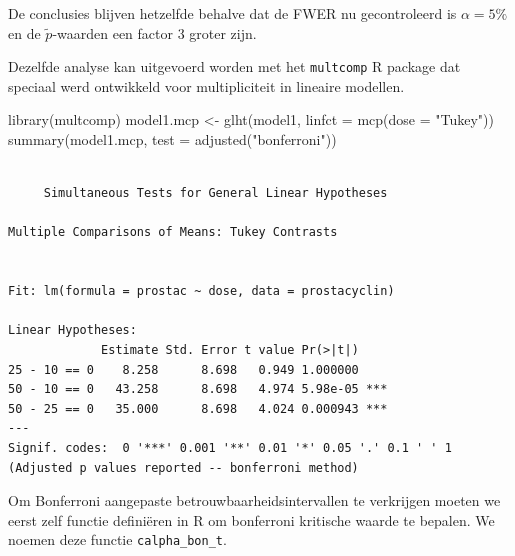 \documentclass[
  dutch,
  letterpaper,
  12pt]{book}
\newenvironment{Shaded}{\begin{snugshade}}{\end{snugshade}}
\newcommand{\AttributeTok}[1]{\textcolor[rgb]{0.40,0.45,0.13}{#1}}
\newcommand{\ControlFlowTok}[1]{\textcolor[rgb]{0.00,0.23,0.31}{\textbf{#1}}}
\newcommand{\DecValTok}[1]{\textcolor[rgb]{0.68,0.00,0.00}{#1}}
\newcommand{\FunctionTok}[1]{\textcolor[rgb]{0.28,0.35,0.67}{#1}}
\newcommand{\NormalTok}[1]{\textcolor[rgb]{0.00,0.23,0.31}{#1}}
\newcommand{\OtherTok}[1]{\textcolor[rgb]{0.00,0.23,0.31}{#1}}
\newcommand{\SpecialCharTok}[1]{\textcolor[rgb]{0.37,0.37,0.37}{#1}}
\newcommand{\StringTok}[1]{\textcolor[rgb]{0.13,0.47,0.30}{#1}}
\theoremstyle{definition}
\theoremstyle{definition}
\theoremstyle{definition}
\theoremstyle{remark}
\begin{document}
De conclusies blijven hetzelfde behalve dat de FWER nu gecontroleerd is
\(\alpha=5\%\) en de \(\tilde{p}\)-waarden een factor 3 groter zijn.

Dezelfde analyse kan uitgevoerd worden met het \texttt{multcomp} R
package dat speciaal werd ontwikkeld voor multipliciteit in lineaire
modellen.

\begin{Shaded}
\begin{Highlighting}[]
\FunctionTok{library}\NormalTok{(multcomp)}
\NormalTok{model1.mcp }\OtherTok{\textless{}{-}} \FunctionTok{glht}\NormalTok{(model1, }\AttributeTok{linfct =} \FunctionTok{mcp}\NormalTok{(}\AttributeTok{dose =} \StringTok{"Tukey"}\NormalTok{))}
\FunctionTok{summary}\NormalTok{(model1.mcp, }\AttributeTok{test =} \FunctionTok{adjusted}\NormalTok{(}\StringTok{"bonferroni"}\NormalTok{))}
\end{Highlighting}
\end{Shaded}

\begin{verbatim}

     Simultaneous Tests for General Linear Hypotheses

Multiple Comparisons of Means: Tukey Contrasts


Fit: lm(formula = prostac ~ dose, data = prostacyclin)

Linear Hypotheses:
             Estimate Std. Error t value Pr(>|t|)    
25 - 10 == 0    8.258      8.698   0.949 1.000000    
50 - 10 == 0   43.258      8.698   4.974 5.98e-05 ***
50 - 25 == 0   35.000      8.698   4.024 0.000943 ***
---
Signif. codes:  0 '***' 0.001 '**' 0.01 '*' 0.05 '.' 0.1 ' ' 1
(Adjusted p values reported -- bonferroni method)
\end{verbatim}

Om Bonferroni aangepaste betrouwbaarheidsintervallen te verkrijgen
moeten we eerst zelf functie definiëren in R om bonferroni kritische
waarde te bepalen. We noemen deze functie \texttt{calpha\_bon\_t}.

\begin{Shaded}
\end{Shaded}
\end{document}
